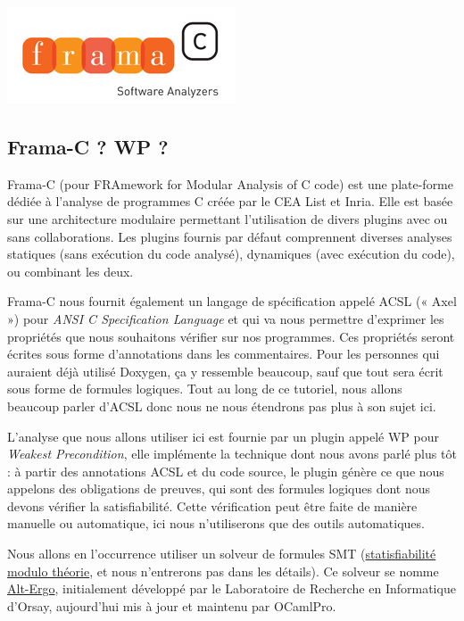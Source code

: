 \documentclass[12pt,francais,]{scrbook}
\begin{document}
\begin{center}\includegraphics[scale=0.5]{framac.png}\end{center}

\subsection{Frama-C ? WP ?}\label{frama-c-wp}

Frama-C (pour FRAmework for Modular Analysis of C code) est une
plate-forme dédiée à l'analyse de programmes C créée par le CEA List et
Inria. Elle est basée sur une architecture modulaire permettant
l'utilisation de divers plugins avec ou sans collaborations. Les plugins
fournis par défaut comprennent diverses analyses statiques (sans
exécution du code analysé), dynamiques (avec exécution du code), ou
combinant les deux.

Frama-C nous fournit également un langage de spécification appelé ACSL
(« Axel ») pour \emph{ANSI C Specification Language} et qui va nous
permettre d'exprimer les propriétés que nous souhaitons vérifier sur nos
programmes. Ces propriétés seront écrites sous forme d'annotations dans
les commentaires. Pour les personnes qui auraient déjà utilisé Doxygen,
ça y ressemble beaucoup, sauf que tout sera écrit sous forme de formules
logiques. Tout au long de ce tutoriel, nous allons beaucoup parler
d'ACSL donc nous ne nous étendrons pas plus à son sujet ici.

L'analyse que nous allons utiliser ici est fournie par un plugin appelé
WP pour \emph{Weakest Precondition}, elle implémente la technique dont
nous avons parlé plus tôt : à partir des annotations ACSL et du code
source, le plugin génère ce que nous appelons des obligations de
preuves, qui sont des formules logiques dont nous devons vérifier la
satisfiabilité. Cette vérification peut être faite de manière manuelle
ou automatique, ici nous n'utiliserons que des outils automatiques.

Nous allons en l'occurrence utiliser un solveur de formules SMT
(\href{https://fr.wikipedia.org/wiki/Satisfiability_modulo_theories}{statisfiabilité
modulo théorie}, et nous n'entrerons pas dans les détails). Ce solveur
se nomme \href{http://alt-ergo.lri.fr/}{Alt-Ergo}, initialement
développé par le Laboratoire de Recherche en Informatique d'Orsay,
aujourd'hui mis à jour et maintenu par OCamlPro.
\end{document}

